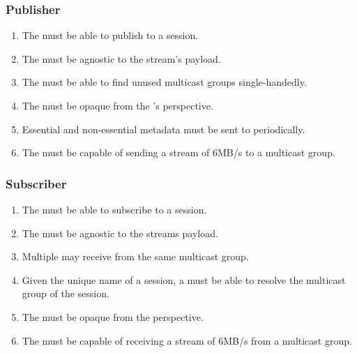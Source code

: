 \subsubsection*{Publisher}
\begin{enumerate}[ref=R-A-PUB-\arabic* on P.\thepage]
	\item The \pubs{} must be able to publish to a session. \label{req:a:pub:publishtopic}
	\item The \pub{} must be agnostic to the stream's payload.\label{req:a:pub:agnosticpayload}
	\item The  must be able to find unused multicast groups single-handedly. \label{req:a:pub:unushedsession}
	\item The \pub{} must be opaque from the \pro's perspective. \label{req:a:pub:transparent}
	\item Essential and non-essential metadata must be sent to  periodically. \label{req:a:pub:metaperiodic}
	\item The \pub{} must be capable of sending a stream of 6MB/s to a multicast group. \label{req:a:pub:6mb}
\end{enumerate}

\subsubsection*{Subscriber}
\begin{enumerate}[ref=R-A-SUB-\arabic* on P.\thepage]
	\item The \subs{} must be able to subscribe to a session.\label{req:a:s:subtopic}
	\item The \sub{} must be agnostic to the streams payload.\label{req:a:s:agnosticpayload}
	\item Multiple \subs{} may receive from the same multicast group.\label{req:a:s:multireceiv}
	\item Given the unique name of a session, a  must be able to resolve the multicast group of the session.\label{req:a:s:resolvemg}
	\item The \sub{} must be opaque from the  perspective.\label{req:a:s:transparent}
	\item The \sub{} must be capable of receiving a stream of 6MB/s from a multicast group.\label{req:a:s:recv6mb}
\end{enumerate}

